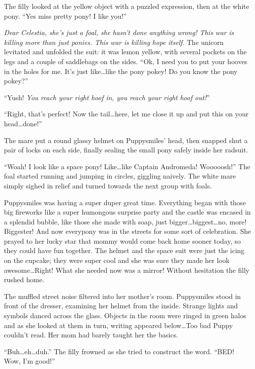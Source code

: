 The filly looked at the yellow object with a puzzled expression, then at the white pony. ``Yes miss pretty pony! I like you!''

\emph{Dear Celestia, she's just a foal, she hasn't done anything wrong! This war is killing more than just ponies. This war is killing hope itself.} The unicorn levitated and unfolded the suit: it was lemon yellow, with several pockets on the legs and a couple of saddlebags on the sides. ``Ok, I need you to put your hooves in the holes for me. It's just like\dots like the pony pokey! Do you know the pony pokey?''

``Yush! \emph{You reach your right hoof in, you reach your right hoof out!}''

``Right, that's perfect! Now the tail\dots here, let me close it up and put this on your head\dots done!''

The mare put a round glassy helmet on Puppysmiles' head, then snapped shut a pair of locks on each side, finally sealing the small pony safely inside her radsuit.

``Woah! I look like a space pony! Like\dots like Captain Andromeda! Wooooosh!'' The foal started running and jumping in circles, giggling naively. The white mare simply sighed in relief and turned towards the next group with foals.

Puppysmiles was having a super duper great time. Everything began with those big fireworks like a super humongous surprise party and the castle was encased in a splendid bubble, like those she made with soap, just bigger\dots biggest\dots no, more! Biggester! And now everypony was in the streets for some sort of celebration. She prayed to her lucky star that mommy would come back home sooner today, so they could have fun together. The helmet and the space suit were just the icing on the cupcake; they were super cool and she was sure they made her look awesome\dots Right! What she needed now was a mirror! Without hesitation the filly rushed home.

The muffled street noise filtered into her mother's room. Puppysmiles stood in front of the dresser, examining her helmet from the inside. Strange lights and symbols danced across the glass. Objects in the room were ringed in green halos and as she looked at them in turn, writing appeared below\dots Too bad Puppy couldn't read. Her mom had barely taught her the basics.

``Buh\dots eh\dots duh.'' The filly frowned as she tried to construct the word. ``BED! Wow, I'm good!''

